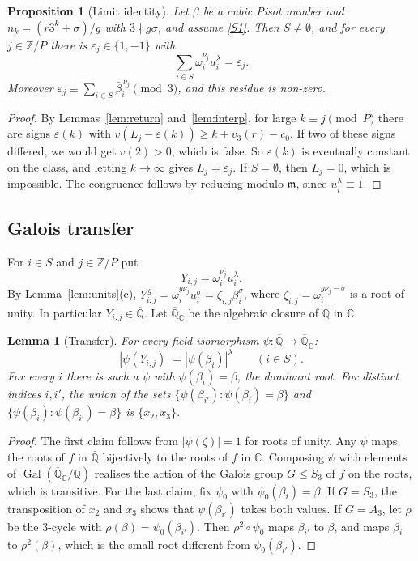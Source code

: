 \documentclass[11pt,a4paper]{article}
\newtheorem{lemma}[theorem]{Lemma}
\newtheorem{proposition}[theorem]{Proposition}
\theoremstyle{definition}
\theoremstyle{remark}
\newcommand{\Q}{\mathbb{Q}}
\newcommand{\Z}{\mathbb{Z}}
\newcommand{\C}{\mathbb{C}}
\newcommand{\Qbar}{\overline{\mathbb{Q}}}
\DeclareMathOperator{\Gal}{Gal}
\begin{document}
\begin{proposition}[Limit identity]\label{prop:identity}
Let $\beta$ be a cubic Pisot number and $n_k=(r3^k+\sigma)/g$ with $3\nmid g\sigma$, and assume \ref{S1}.
Then $S\ne\emptyset$, and for every $j\in\Z/P$ there is $\varepsilon_j\in\{1,-1\}$ with
\begin{equation}\label{eq:limit}
 \sum_{i\in S}\omega_i^{\nu_j}u_i^{\lambda}=\varepsilon_j .
\end{equation}
Moreover $\varepsilon_j\equiv\sum_{i\in S}\bar\beta_i^{\,\nu_j}\pmod 3$, and this residue is non-zero.
\end{proposition}
\begin{proof}
By Lemmas~\ref{lem:return} and~\ref{lem:interp}, for large $k\equiv j\pmod P$ there are signs $\varepsilon(k)$ with $v(L_j-\varepsilon(k))\ge k+v_3(r)-c_0$.
If two of these signs differed, we would get $v(2)>0$, which is false. So $\varepsilon(k)$ is eventually constant on the class, and letting $k\to\infty$ gives $L_j=\varepsilon_j$.
If $S=\emptyset$, then $L_j=0$, which is impossible.
The congruence follows by reducing modulo $\mathfrak m$, since $u_i^\lambda\equiv1$.
\end{proof}

\subsection{Galois transfer}
For $i\in S$ and $j\in\Z/P$ put
\[
 Y_{i,j}=\omega_i^{\nu_j}u_i^{\lambda}.
\]
By Lemma~\ref{lem:units}(c), $Y_{i,j}^{\,g}=\omega_i^{g\nu_j}u_i^{\sigma}=\zeta_{i,j}\beta_i^{\sigma}$, where $\zeta_{i,j}=\omega_i^{g\nu_j-\sigma}$ is a root of unity. In particular $Y_{i,j}\in\Qbar$.
Let $\Qbar_\C$ be the algebraic closure of $\Q$ in $\C$.

\begin{lemma}[Transfer]\label{lem:transfer}
For every field isomorphism $\psi:\Qbar\to\Qbar_\C$:
\[
 |\psi(Y_{i,j})|=|\psi(\beta_i)|^{\lambda}\qquad(i\in S).
\]
For every $i$ there is such a $\psi$ with $\psi(\beta_i)=\beta$, the dominant root.
For distinct indices $i,i'$, the union of the sets $\{\psi(\beta_{i'}):\psi(\beta_i)=\beta\}$ and $\{\psi(\beta_i):\psi(\beta_{i'})=\beta\}$ is $\{x_2,x_3\}$.
\end{lemma}
\begin{proof}
The first claim follows from $|\psi(\zeta)|=1$ for roots of unity.
Any $\psi$ maps the roots of $f$ in $\Qbar$ bijectively to the roots of $f$ in $\C$.
Composing $\psi$ with elements of $\Gal(\Qbar_\C/\Q)$ realises the action of the Galois group $G\le S_3$ of $f$ on the roots, which is transitive.
For the last claim, fix $\psi_0$ with $\psi_0(\beta_i)=\beta$.
If $G=S_3$, the transposition of $x_2$ and $x_3$ shows that $\psi(\beta_{i'})$ takes both values.
If $G=A_3$, let $\rho$ be the $3$-cycle with $\rho(\beta)=\psi_0(\beta_{i'})$. Then $\rho^{2}\circ\psi_0$ maps $\beta_{i'}$ to $\beta$, and maps $\beta_i$ to $\rho^2(\beta)$, which is the small root different from $\psi_0(\beta_{i'})$.
\end{proof}
\end{document}
